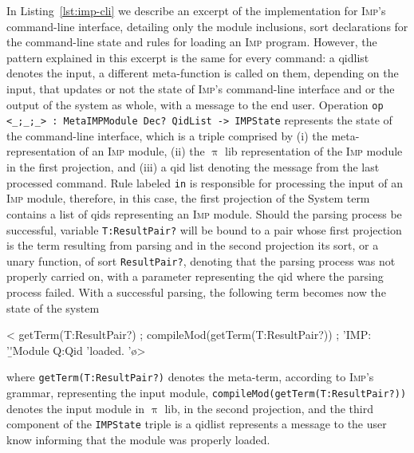 \documentclass[a4paper,openany]{book}
\begin{document}
In Listing~\ref{lst:imp-cli} we describe an excerpt of the implementation for \textsc{Imp}'s command-line interface, detailing only the module inclusions, sort declarations for the command-line state and rules for loading an \textsc{Imp} program. 
However, the pattern explained in this excerpt is the same for every command: a qidlist denotes the input, a different meta-function is called on them, depending on the input, that updates or not the state of \textsc{Imp}'s command-line interface and or the output of the system as whole, with a message to the end user.  
%
Operation \texttt{op <\_;\_;\_> : MetaIMPModule Dec? QidList -> IMPState} represents the state of the command-line interface, which is a triple comprised by (i) the meta-representation of an \textsc{Imp} module, (ii) the $\uppi$ lib representation of the \textsc{Imp} module in the first projection, and (iii) a qid list denoting the message from the last processed command. Rule labeled \texttt{in} is responsible for processing the input of an \textsc{Imp} module, therefore, in this case, the first projection of the System term contains a list of qids representing an \textsc{Imp} module. Should the parsing process be successful, variable \texttt{T:ResultPair?} will be bound to a pair whose first projection is the term resulting from  parsing and in the second projection its sort, or a unary function, of sort \texttt{ResultPair?}, denoting that the parsing process was not properly carried on, with a parameter representing the qid where the parsing process failed. With a successful parsing, the following term becomes now the state of the system
\begin{maude}
< getTerm(T:ResultPair?) ; compileMod(getTerm(T:ResultPair?)) ; 
   'IMP: '\b 'Module Q:Qid 'loaded. '\o  >
\end{maude}
where \texttt{getTerm(T:ResultPair?)} denotes the meta-term, according to \textsc{Imp}'s grammar, representing the input module,  \texttt{compileMod(getTerm(T:ResultPair?))} denotes the input module in $\uppi$ lib, in the second projection, and the third component of the \texttt{IMPState} triple is a qidlist represents a message to the user know informing that the module was properly loaded.
\end{document}
